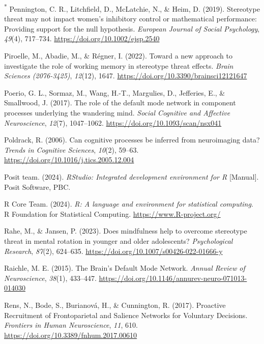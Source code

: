 \documentclass[
  stu, a4paper,floatsintext]{apa7}
\newlength{\cslhangindent}
\newenvironment{CSLReferences}[2] %
 {\begin{list}{}{%
  \setlength{\itemindent}{0pt}
  \setlength{\leftmargin}{0pt}
  \setlength{\parsep}{0pt}
  \ifodd #1
   \setlength{\leftmargin}{\cslhangindent}
   \setlength{\itemindent}{-1\cslhangindent}
  \fi
  \setlength{\itemsep}{#2\baselineskip}}}
 {\end{list}}
\begin{document}
\begin{CSLReferences}{1}{0}
\textsuperscript{*} Pennington, C. R., Litchfield, D., McLatchie, N., \& Heim, D. (2019). Stereotype threat may not impact women's inhibitory control or mathematical performance: {Providing} support for the null hypothesis. \emph{European Journal of Social Psychology}, \emph{49}(4), 717--734. \url{https://doi.org/10.1002/ejsp.2540}

Piroelle, M., Abadie, M., \& Régner, I. (2022). Toward a new approach to investigate the role of working memory in stereotype threat effects. \emph{Brain Sciences (2076-3425)}, \emph{12}(12), 1647. \url{https://doi.org/10.3390/brainsci12121647}

Poerio, G. L., Sormaz, M., Wang, H.-T., Margulies, D., Jefferies, E., \& Smallwood, J. (2017). The role of the default mode network in component processes underlying the wandering mind. \emph{Social Cognitive and Affective Neuroscience}, \emph{12}(7), 1047--1062. \url{https://doi.org/10.1093/scan/nsx041}

Poldrack, R. (2006). Can cognitive processes be inferred from neuroimaging data? \emph{Trends in Cognitive Sciences}, \emph{10}(2), 59--63. \url{https://doi.org/10.1016/j.tics.2005.12.004}

Posit team. (2024). \emph{{RStudio}: {Integrated} development environment for {R}} {[}Manual{]}. Posit Software, PBC.

R Core Team. (2024). \emph{R: A language and environment for statistical computing}. R Foundation for Statistical Computing. \url{https://www.R-project.org/}

Rahe, M., \& Jansen, P. (2023). Does mindfulness help to overcome stereotype threat in mental rotation in younger and older adolescents? \emph{Psychological Research}, \emph{87}(2), 624--635. \url{https://doi.org/10.1007/s00426-022-01666-y}

Raichle, M. E. (2015). The {Brain}'s {Default Mode Network}. \emph{Annual Review of Neuroscience}, \emph{38}(1), 433--447. \url{https://doi.org/10.1146/annurev-neuro-071013-014030}

Rens, N., Bode, S., Burianová, H., \& Cunnington, R. (2017). Proactive {Recruitment} of {Frontoparietal} and {Salience Networks} for {Voluntary Decisions}. \emph{Frontiers in Human Neuroscience}, \emph{11}, 610. \url{https://doi.org/10.3389/fnhum.2017.00610}


\end{CSLReferences}
\end{document}
